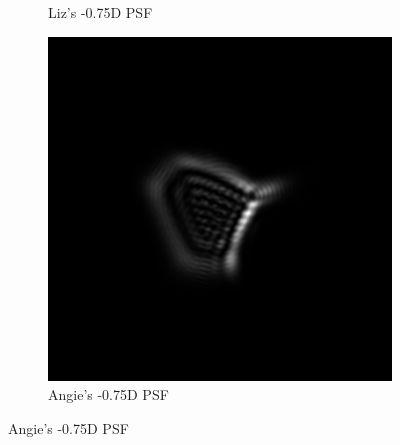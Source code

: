 \documentclass{article}
\begin{document}
\begin{figure}[H]
\begin{subfigure}{.3\textwidth}
  \caption{Liz's -0.75D PSF}
  \label{fig:lizn075dpsf}
\end{subfigure}
\begin{subfigure}{.3\textwidth}
  \centering
  \includegraphics[width=1\linewidth]{Angie_R_0526_1_500_zer_-075_5_PSF.png}
  \caption{Angie's -0.75D PSF}
  \label{fig:angien075dpsf}
\end{subfigure}


\medskip


\end{figure}
\end{document}
